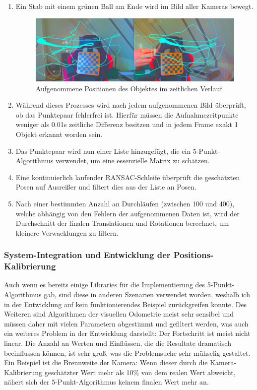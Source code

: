 \documentclass[12pt, ngerman]{article}
\begin{document}
\begin{enumerate}
  \item Ein Stab mit einem grünen Ball am Ende wird im Bild aller Kameras bewegt.
  \vspace{10pt}
  \begin{figure}[hbtp!]
      \includegraphics[width=\textwidth]{crack.png}
      \caption{Aufgenommene Positionen des Objektes im zeitlichen Verlauf}
      \label{Abb: wand}
  \end{figure}
  
  \item Während dieses Prozesses wird nach jedem aufgenommenen Bild überprüft, ob das Punktepaar fehlerfrei ist. Hierfür müssen die Aufnahmezeitpunkte weniger als 0.01s zeitliche Differenz besitzen und in jedem Frame exakt 1 Objekt erkannt worden sein.
  \item Das Punktepaar wird nun einer Liste hinzugefügt, die ein 5-Punkt-Algorithmus verwendet, um eine essenzielle Matrix zu schätzen. 
  \item Eine kontinuierlich laufender RANSAC-Schleife überprüft die geschätzten Posen auf Ausreißer und filtert dies aus der Liste an Posen.
  \item Nach einer bestimmten Anzahl an Durchläufen (zwischen 100 und 400), welche abhängig von den Fehlern der aufgenommenen Daten ist, wird der Durchschnitt der finalen Translationen und Rotationen berechnet, um kleinere Verwacklungen zu filtern.
\end{enumerate}

\subsubsection{System-Integration und Entwicklung der Positions-Kalibrierung}
Auch wenn es bereits einige Libraries für die Implementierung des 5-Punkt-Algorithmus gab, sind diese in anderen Szenarien verwendet worden, weshalb ich in der Entwicklung auf kein funktionierendes Beispiel zurückgreifen konnte. Des Weiteren sind Algorithmen der visuellen Odometrie meist sehr sensibel und müssen daher mit vielen Parametern abgestimmt und gefiltert werden, was auch ein weiteres Problem in der Entwicklung darstellt: Der Fortschritt ist meist nicht linear. Die Anzahl an Werten und Einflüssen, die die Resultate dramatisch beeinflussen können, ist sehr groß, was die Problemsuche sehr mühselig gestaltet. Ein Beispiel ist die Brennweite der Kamera: Wenn dieser durch die Kamera-Kalibrierung geschätzter Wert mehr als 10\% von dem realen Wert abweicht, nähert sich der 5-Punkt-Algorithmus keinem finalen Wert mehr an. 
\end{document}
